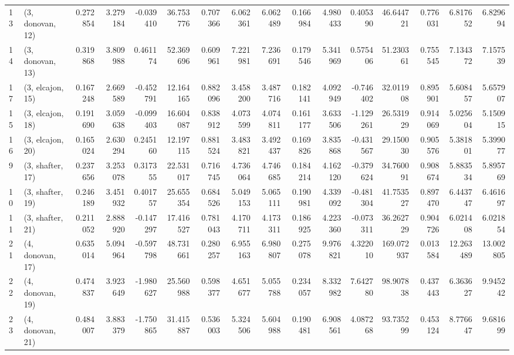 \begin{tabular}{llrrrrrrrrrrrrrr}
13 &  (3, donovan, 12) &   0.272854 &  3.279184 & -0.039410 &  36.753776 &  0.707366 &   6.062361 &  6.062489 &  0.166984 &  4.980433 &  0.405390 &   46.644721 &  0.776031 &   6.817652 &   6.829694 \\
14 &  (3, donovan, 13) &   0.319868 &  3.809988 &  0.461174 &  52.369696 &  0.609961 &   7.221981 &  7.236691 &  0.179546 &  5.341969 &  0.575406 &   51.230361 &  0.755545 &   7.134372 &   7.157539 \\
17 &  (3, elcajon, 15) &   0.167248 &  2.669589 & -0.452791 &  12.164165 &  0.882096 &   3.458200 &  3.487716 &  0.182141 &  4.092949 & -0.746402 &   32.011908 &  0.895901 &   5.608457 &   5.657907 \\
15 &  (3, elcajon, 18) &   0.191690 &  3.059638 & -0.099403 &  16.604087 &  0.838912 &   4.073599 &  4.074811 &  0.161177 &  3.633506 & -1.129261 &   26.531929 &  0.914069 &   5.025604 &   5.150915 \\
16 &  (3, elcajon, 20) &   0.165024 &  2.630294 &  0.245160 &  12.197115 &  0.881524 &   3.483821 &  3.492437 &  0.169826 &  3.835868 & -0.431567 &   29.150030 &  0.905576 &   5.381801 &   5.399077 \\
9  &  (3, shafter, 17) &   0.237656 &  3.253078 &  0.317355 &  22.531017 &  0.716745 &   4.736064 &  4.746685 &  0.184214 &  4.162120 & -0.379624 &   34.760091 &  0.908674 &   5.883534 &   5.895769 \\
10 &  (3, shafter, 19) &   0.246189 &  3.451932 &  0.401757 &  25.655354 &  0.684526 &   5.049153 &  5.065111 &  0.190981 &  4.339092 & -0.481304 &   41.753527 &  0.897470 &   6.443747 &   6.461697 \\
11 &  (3, shafter, 21) &   0.211052 &  2.888920 & -0.147297 &  17.416527 &  0.781043 &   4.170711 &  4.173311 &  0.186925 &  4.223360 & -0.073311 &   36.262729 &  0.904726 &   6.021408 &   6.021854 \\
21 &  (4, donovan, 17) &   0.635014 &  5.094964 & -0.597798 &  48.731661 &  0.280257 &   6.955163 &  6.980807 &  0.275078 &  9.976821 &  4.322010 &  169.072937 &  0.013584 &  12.263489 &  13.002805 \\
22 &  (4, donovan, 19) &   0.474837 &  3.923649 & -1.980627 &  25.560988 &  0.598377 &   4.651677 &  5.055788 &  0.234057 &  8.332982 &  7.642780 &   98.907838 &  0.437443 &   6.363627 &   9.945242 \\
23 &  (4, donovan, 21) &   0.484007 &  3.883379 & -1.750865 &  31.415887 &  0.536003 &   5.324506 &  5.604988 &  0.190481 &  6.908561 &  4.087268 &   93.735299 &  0.453124 &   8.776647 &   9.681699 \\

\end{tabular}
